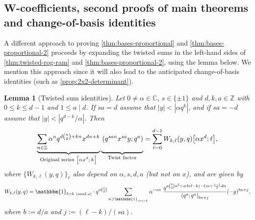 \documentclass[reqno,11pt]{amsart}
\newtheorem{lemma}[theorem]{Lemma}
\theoremstyle{definition}
\theoremstyle{remark}
\newtheorem*{remark}{Remark}
\numberwithin{equation}{section}
\newcommand{\Z}{\mathbb{Z}}
\newcommand{\C}{\mathbb{C}}
\newcommand{\one}{\mathbbm{1}}
\newcommand{\vect}[2]{\big[{#1};{#2}\big]}
\newcommand{\fix}[1]{\textcolor{blue}{\large (#1)\normalsize}}
\begin{document}
\subsection{W-coefficients, second proofs of main theorems and change-of-basis identities} \label{subsec:w-coeffs}
A different approach to proving \cref{thm:bases-proportional} and \cref{thm:bases-proportional-2} proceeds by expanding the twisted sums in the left-hand sides of \cref{thm:twisted-rog-ram} and \cref{thm:bases-proportional-2}, using the lemma below. We mention this approach since it will also lead to the anticipated change-of-basis identities (such as \cref{prop:2x2-determinant}).


\begin{lemma}[Twisted sum identities] \label{lem:t-identities}
Let $0 \neq \alpha \in \C$, $s \in \{\pm 1\}$ and $d, k, a \in \Z$ with $0 \le k \le d-1$ and $1 \le a \mid d$. If $sa = d$ assume that $|y| < \left\vert \alpha q^k \right\vert$, and if $sa = -d$ assume that $|y| < \left\vert q^{d-k}/\alpha\right\vert$. Then
\begin{equation}\label{eq:twisted-series}
    \underbrace{\sum_{n \in \Z} \alpha^n q^{d\binom{n}{2}+kn} x^{dn+k}}_{\text{Original series $\vect{\alpha x^d}{k}$}} \underbrace{\vphantom{\sum_{n \in \Z}} \left(q^{san}x^{sa} y; q^{a}\right)}_{\text{Twist factor}}
    =
    \sum_{\ell=0}^{d-1} W_{k,\ell}(y, q)
    \vect{\alpha x^d}{\ell},
\end{equation}
where $\{W_{k,\ell}(y, q)\}_\ell$ also depend on $\alpha, s, d, a$ (but not on $x$), and are given by
\begin{equation}\label{eq:w-coeffs-value}
    W_{k,\ell}(y, q)
    = 
    \one_{\ell \equiv k\ (\textnormal{mod }a)} \cdot
    q^{a \binom{j}{2}}
    \sum_{n \ge \one_{s\ell < sk}}
    \alpha^{-sn}\ \frac{q^{a \binom{b}{2} n^2 + s(b(\ell-k)-\ell)n + \frac{s-1}{2}dn}}{\left(q^{a}; q^{a}\right)_{bn+j}} (-y)^{bn+j},
\end{equation}
where $b := d/a$ and $j := (\ell - k)/(sa)$.
\end{lemma}
\end{document}
